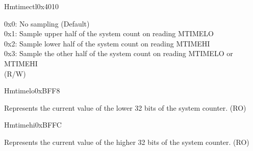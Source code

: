 \begin{register}{H}{mtimectl}{0x4010}
\begin{regdesc}
\begin{reglist}
0x0: No sampling (Default)\\
0x1: Sample upper half of the system count on reading MTIMELO\\
0x2: Sample lower half of the system count on reading MTIMEHI\\
0x3: Sample the other half of the system count on reading MTIMELO or MTIMEHI\\
(R/W)
\end{reglist}
\end{regdesc}
\end{register}

\begin{register}{H}{mtimelo}{0xBFF8}\label{regdesc:CLINTMTIMELOREG}
%
\regnewline%
\begin{regdesc}
\begin{reglist}
\label{fielddesc:CLINTMTIMELO}\item [MTIMELO] Represents the current value of the lower 32 bits of the system counter. (RO)
\end{reglist}
\end{regdesc}
\end{register}

\begin{register}{H}{mtimehi}{0xBFFC}\label{regdesc:CLINTMTIMEHIREG}
%
\regnewline%
\begin{regdesc}
\begin{reglist}
\label{fielddesc:CLINTMTIMEHI}\item [MTIMEHI] Represents the current value of the higher 32 bits of the system counter. (RO)
\end{reglist}
\end{regdesc}
\end{register}
